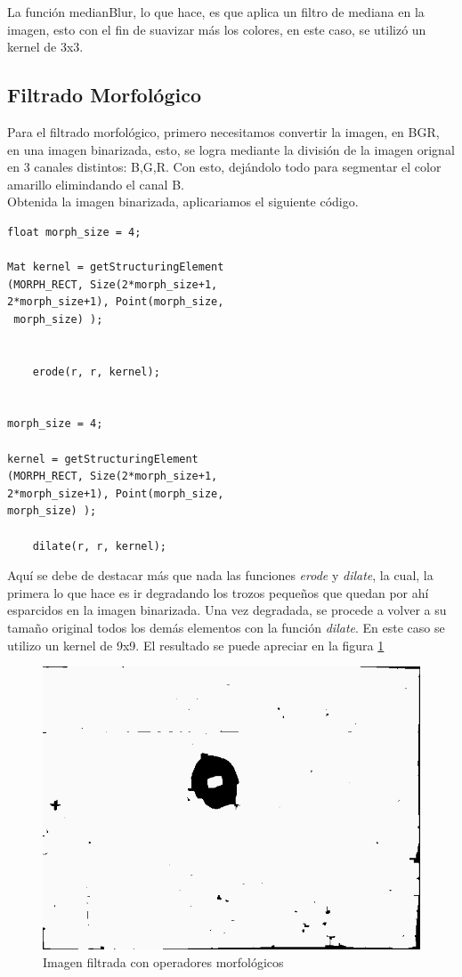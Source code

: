 \documentclass[spanish,10pt,letterpaper, twocolumn]{article}
\begin{document}
La funci\'on medianBlur, lo que hace, es que aplica un filtro de mediana en la imagen, esto con el fin de suavizar m\'as los colores, en este caso, se utiliz\'o un kernel de 3x3.


\subsection{Filtrado Morfol\'ogico}
Para el filtrado morfol\'ogico, primero necesitamos convertir la imagen, en BGR, en una imagen binarizada, esto, se logra mediante la divisi\'on de la imagen orignal en 3 canales distintos: B,G,R. Con esto, dej\'andolo todo para segmentar el color amarillo elimindando el canal B. \\
Obtenida la imagen binarizada, aplicariamos el siguiente c\'odigo.

\lstset{language=C++}
\begin{lstlisting}[frame=single]
float morph_size = 4; 

Mat kernel = getStructuringElement
(MORPH_RECT, Size(2*morph_size+1, 
2*morph_size+1), Point(morph_size,
 morph_size) );


	erode(r, r, kernel);


morph_size = 4;

kernel = getStructuringElement
(MORPH_RECT, Size(2*morph_size+1,
2*morph_size+1), Point(morph_size, 
morph_size) );

	dilate(r, r, kernel);
\end{lstlisting}

Aqu\'i se debe de destacar m\'as que nada las funciones \textit{erode} y \textit{dilate}, la cual, la primera lo que hace es ir degradando los trozos peque\~nos que quedan por ah\'i esparcidos en la imagen binarizada. Una vez degradada, se procede a volver a su tama\~no original todos los dem\'as elementos con la funci\'on \textit{dilate}. En este caso se utilizo un kernel de 9x9. El resultado se puede apreciar en la figura \ref{vision:fig5}

\begin{figure}[ht]
	\centering
	\includegraphics[scale=0.2]{filtrado150.jpg}
	\caption{Imagen  filtrada con operadores morfol\'ogicos}
	\label{vision:fig5}
\end{figure}
\end{document}
